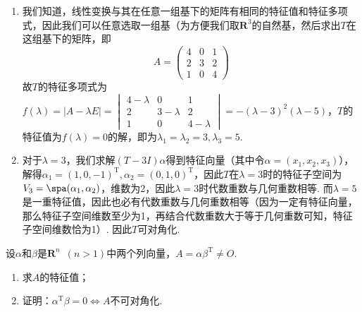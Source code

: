 \begin{solution}
    \begin{enumerate}
        \item 我们知道，线性变换与其在任意一组基下的矩阵有相同的特征值和特征多项式，因此我们可以任意选取一组基（为方便我们取$\mathbf{R}^3$的自然基，然后求出$T$在这组基下的矩阵，即
              \[A=\begin{pmatrix}
                      4 & 0 & 1 \\
                      2 & 3 & 2 \\
                      1 & 0 & 4
                  \end{pmatrix}\]
              故$T$的特征多项式为$f(\lambda)=|A-\lambda E|=\begin{vmatrix}
                      4-\lambda & 0         & 1         \\
                      2         & 3-\lambda & 2         \\
                      1         & 0         & 4-\lambda
                  \end{vmatrix}=-(\lambda-3)^2(\lambda-5)$，$T$的特征值为$f(\lambda)=0$的解，即为$\lambda_1=\lambda_2=3,\lambda_3=5$.

        \item 对于$\lambda=3$，我们求解$(T-3I)\alpha$得到特征向量（其中令$\alpha=(x_1,x_2,x_3)$），解得$\alpha_1=(1,0,-1)^\mathrm{T},\alpha_2=(0,1,0)^\mathrm{T}$，因此$T$在$\lambda=3$时的特征子空间为$V_3=\spa(\alpha_1,\alpha_2)$，维数为2，因此$\lambda=3$时代数重数与几何重数相等. 而$\lambda=5$是一重特征值，因此也必有代数重数与几何重数相等（因为一定有特征向量，那么特征子空间维数至少为1，再结合代数重数大于等于几何重数可知，特征子空间维数恰为1）. 因此$T$可对角化.
    \end{enumerate}
\end{solution}

\begin{example}\label{ex:19:秩1矩阵可对角化}
    设$\alpha$和$\beta$是$\mathbf{R}^n\enspace (n>1)$中两个列向量，$A=\alpha\beta^\mathrm{T}\neq O$.
    \begin{enumerate}
        \item 求$A$的特征值；

        \item 证明：$\alpha^\mathrm{T}\beta=0\iff A$不可对角化.
    \end{enumerate}
\end{example}

